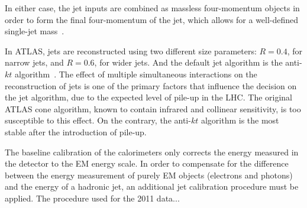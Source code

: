 In either case, the jet inputs are combined as massless four-momentum objects in order to form the final four-momentum of the jet, which allows for a well-defined single-jet mass~\cite{Busato:1271710}.


In ATLAS, jets are reconstructed using two different size parameters: $R = 0.4$, for narrow jets, and $R = 0.6$, for wider jets. And the default jet algorithm is the anti-$kt$ algorithm~\cite{Asquith:1311867}. The effect of multiple simultaneous interactions on the reconstruction of jets is one of the primary factors that influence the decision on the jet algorithm, due to the expected level of pile-up in the LHC. The original ATLAS cone algorithm, known to contain infrared and collinear sensitivity, is too susceptible to this effect. On the contrary, the anti-$kt$ algorithm is the most stable after the introduction of pile-up.  


The baseline calibration of the calorimeters only corrects the energy measured in the detector to the EM energy scale. In order to compensate for the difference between the energy measurement of purely EM objects (electrons and photons) and the energy of a hadronic jet, an additional jet calibration procedure must be applied.  The procedure used for the 2011 data...


